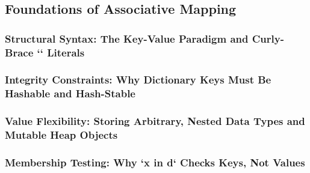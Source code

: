 \subsection{Foundations of Associative Mapping}
\subsubsection{Structural Syntax: The Key-Value Paradigm and Curly-Brace `{}` Literals}
\subsubsection{Integrity Constraints: Why Dictionary Keys Must Be Hashable and Hash-Stable}
\subsubsection{Value Flexibility: Storing Arbitrary, Nested Data Types and Mutable Heap Objects}
\subsubsection{Membership Testing: Why `x in d` Checks Keys, Not Values}
